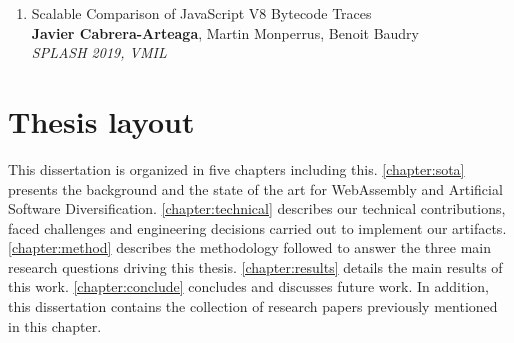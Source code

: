 \begin{enumerate}[label=\subscript{P}{{\arabic*}}]
    \item Scalable Comparison of JavaScript V8 Bytecode Traces \cite{STRAC}\\
    {\small\textbf{Javier Cabrera-Arteaga}, Martin Monperrus, Benoit Baudry}\\
    \emph{SPLASH 2019, VMIL}
\end{enumerate}

\pagebreak
\section*{Thesis layout}

This dissertation is organized in five chapters including this. \autoref{chapter:sota} presents the background and the state of the art for WebAssembly and Artificial Software Diversification.
\autoref{chapter:technical} describes our technical contributions, faced challenges and engineering decisions carried out to implement our artifacts. \autoref{chapter:method} describes the methodology followed to answer the three main
research questions driving this thesis. \autoref{chapter:results} details the main results of this work. \autoref{chapter:conclude} concludes and discusses future work. 
In addition, this dissertation contains the collection of research papers previously mentioned in this chapter.